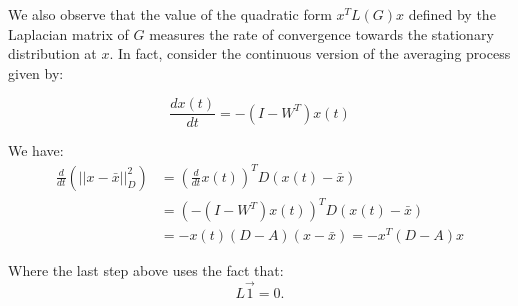 \noindent
We also observe that the value of the quadratic form $x^TL(G)x$ defined by the Laplacian matrix of $G$ measures the rate of convergence towards the stationary distribution at $x$. In fact, consider the continuous version of the averaging process given by:

\[
    \frac{dx(t)}{dt} = - (I-W^T)x(t)
\]


\noindent
We have:
\begin{align*}
    \frac{d}{dt}\left(||x - \bar{x}||_D^2\right) &= \left(\frac{d}{dt}x(t)\right)^TD(x(t)-\bar{x})\\
    &= \left(-(I-W^T)x(t)\right)^TD(x(t)-\bar{x})\\
    &= -x(t) (D-A)(x-\bar{x}) = -x^T(D-A)x
\end{align*}

\noindent
Where the last step above uses the fact that:
\[
    L\vec{1} = 0.
\]
